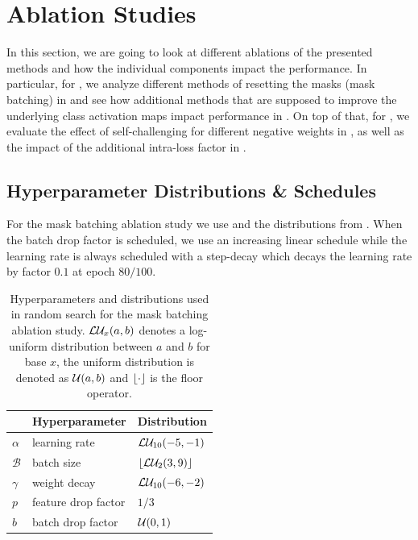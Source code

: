 \section{Ablation Studies}
\label{sec:ablation}

In this section, we are going to look at different ablations of the presented methods and how the individual components impact the performance. In particular, for \divcams, we analyze different methods of resetting the masks (mask batching) in  and see how additional methods that are supposed to improve the underlying class activation maps impact performance in . On top of that, for \prodrop, we evaluate the effect of self-challenging for different negative weights in , as well as the impact of the additional intra-loss factor in .

\subsection{Hyperparameter Distributions \& Schedules}
\label{sec:abl-distr}
For the mask batching ablation study we use \adam \cite{Kingma2015} and the distributions from . When the batch drop factor is scheduled, we use an increasing linear schedule while the learning rate is always scheduled with a step-decay which decays the learning rate by factor $0.1$ at epoch $80/100$.
\begin{table}[!htbp]
    \centering
    \begin{tabular}{lll}
        \toprule
         & \textbf{Hyperparameter} & \textbf{Distribution} \\
        \midrule
        $\alpha$ & learning rate & $\mathcal{L}\mathcal{U}_{10}(-5, -1)$ \\
        $\mathcal{B}$ & batch size  & $\lfloor\mathcal{L}\mathcal{U}_{2}(3, 9)\rfloor$ \\
        $\gamma$ & weight decay  & $\mathcal{L}\mathcal{U}_{10}(-6, -2)$ \\
        $p$ & feature drop factor  & $1/3$ \\
        $b$ & batch drop factor  & $\mathcal{U}(0, 1)$ \\
         \bottomrule 
    \end{tabular}
    \caption[Hyperparameters and distributions used for the mask batching ablation study]{Hyperparameters and distributions used in random search for the mask batching ablation study. $\mathcal{L}\mathcal{U}_{x}(a, b)$ denotes a log-uniform distribution between $a$ and $b$ for base $x$, the uniform distribution is denoted as $\mathcal{U}(a, b)$ and $\lfloor\cdot\rfloor$ is the floor operator.}
    \label{tab:abl-distributions-mask-batching}
\end{table}

